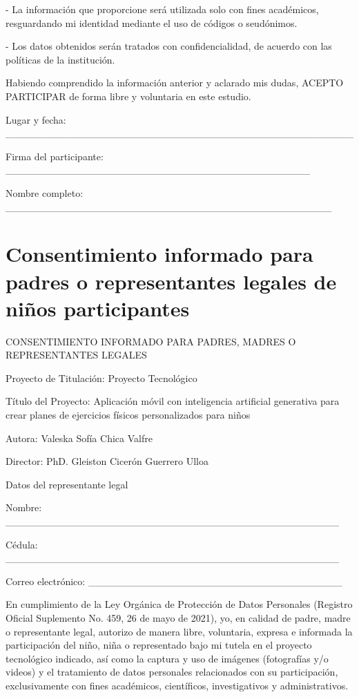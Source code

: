		- La información que proporcione será utilizada solo con fines académicos, resguardando mi identidad mediante el uso de códigos o seudónimos.
		
		- Los datos obtenidos serán tratados con confidencialidad, de acuerdo con las políticas de la institución.
		
		Habiendo comprendido la información anterior y aclarado mis dudas, ACEPTO PARTICIPAR de forma libre y voluntaria en este estudio.
		
		Lugar y fecha: \_\_\_\_\_\_\_\_\_\_\_\_\_\_\_\_\_\_\_\_\_\_\_\_\_\_\_\_\_\_\_\_\_\_\_\_\_\_\_\_\_\_\_\_\_\_\_\_
		
		\vspace{24pt}
		Firma del participante: \_\_\_\_\_\_\_\_\_\_\_\_\_\_\_\_\_\_\_\_\_\_\_\_\_\_\_\_\_\_\_\_\_\_\_\_\_\_\_\_\_\_
		
		Nombre completo: \_\_\_\_\_\_\_\_\_\_\_\_\_\_\_\_\_\_\_\_\_\_\_\_\_\_\_\_\_\_\_\_\_\_\_\_\_\_\_\_\_\_\_\_\_
		
	\section[Padres participantes en la evaluación]{Consentimiento informado para padres o representantes legales de niños participantes}
		\label{app:conrepnino}
		CONSENTIMIENTO INFORMADO PARA PADRES, MADRES O REPRESENTANTES LEGALES
		
		Proyecto de Titulación: Proyecto Tecnológico
		
		Título del Proyecto: Aplicación móvil con inteligencia artificial generativa para crear planes de ejercicios físicos personalizados para niños
		
		Autora: Valeska Sofía Chica Valfre
		
		Director: PhD. Gleiston Cicerón Guerrero Ulloa
		
		Datos del representante legal
		
		Nombre: \_\_\_\_\_\_\_\_\_\_\_\_\_\_\_\_\_\_\_\_\_\_\_\_\_\_\_\_\_\_\_\_\_\_\_\_\_\_\_\_\_\_\_\_\_\_
		
		Cédula: \_\_\_\_\_\_\_\_\_\_\_\_\_\_\_\_\_\_\_\_\_\_\_\_\_\_\_\_\_\_\_\_\_\_\_\_\_\_\_\_\_\_\_\_\_\_
		
		Correo electrónico: \_\_\_\_\_\_\_\_\_\_\_\_\_\_\_\_\_\_\_\_\_\_\_\_\_\_\_\_\_\_\_\_\_\_\_
		
		En cumplimiento de la Ley Orgánica de Protección de Datos Personales (Registro Oficial Suplemento No. 459, 26 de mayo de 2021), yo, en calidad de padre, madre o representante legal, autorizo de manera libre, voluntaria, expresa e informada la participación del niño, niña o representado bajo mi tutela en el proyecto tecnológico indicado, así como la captura y uso de imágenes (fotografías y/o videos) y el tratamiento de datos personales relacionados con su participación, exclusivamente con fines académicos, científicos, investigativos y administrativos.
		
